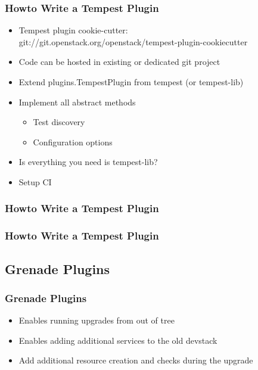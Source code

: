 \documentclass[aspectratio=169,11pt,hyperref={colorlinks=true}]{beamer}
\begin{document}
\begin{frame}
    \frametitle{Howto Write a Tempest Plugin}
    \begin{itemize}
        \item Tempest plugin cookie-cutter: \hfill
        \\ git://git.openstack.org/openstack/tempest-plugin-cookiecutter
    \end{itemize}

    \begin{itemize}
    	\item{Code can be hosted in existing or dedicated git project}
    	\item{Extend plugins.TempestPlugin from tempest (or tempest-lib)}
    	\item{Implement all abstract methods}
    		\begin{itemize}
    			\item{Test discovery}
    			\item{Configuration options}
    		\end{itemize}
    	\item{Is everything you need is tempest-lib?}
    	\item{Setup CI}
    \end{itemize}
\end{frame}

\begin{frame}
    \frametitle{Howto Write a Tempest Plugin}
        
\end{frame}

\begin{frame}
    \frametitle{Howto Write a Tempest Plugin}
        
\end{frame}

\subsection{Grenade Plugins}
\begin{frame}
    \frametitle{Grenade Plugins}
    \begin{itemize}
        \item Enables running upgrades from out of tree
        \item Enables adding additional services to the old devstack
        \item Add additional resource creation and checks during the upgrade
    \end{itemize}
\end{frame}
\end{document}
